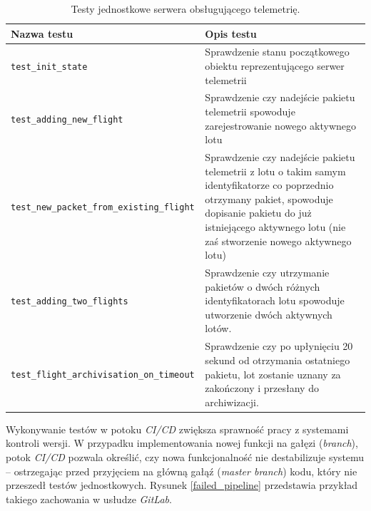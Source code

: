\begin{table}[H]
	\centering\small
	\caption{
        Testy jednostkowe serwera obsługującego telemetrię.
	}
	\label{telem_server_unit_tests}
    
    \begin{tabularx}{\textwidth} { 
        | >{\raggedright\arraybackslash}X 
        | >{\raggedright\arraybackslash}X | }
        \hline
        \textbf{Nazwa testu} & \textbf{Opis testu} \\
        \hline
        \texttt{test\_init\_state} & Sprawdzenie stanu początkowego obiektu reprezentującego serwer telemetrii \\
        \hline
        \texttt{test\_adding\_new\_flight} & Sprawdzenie czy nadejście pakietu telemetrii spowoduje zarejestrowanie nowego aktywnego lotu \\
        \hline
        \texttt{test\_new\_packet\_from\_existing\_flight  } & Sprawdzenie czy nadejście pakietu telemetrii z lotu o takim samym identyfikatorze co poprzednio otrzymany pakiet, spowoduje dopisanie pakietu do już istniejącego aktywnego lotu (nie zaś stworzenie nowego aktywnego lotu) \\
        \hline
        \texttt{test\_adding\_two\_flights} & Sprawdzenie czy utrzymanie pakietów o dwóch różnych identyfikatorach lotu spowoduje utworzenie dwóch aktywnych lotów. \\
        \hline
        \texttt{test\_flight\_archivisation\_on\_timeout} & Sprawdzenie czy po upłynięciu 20 sekund od otrzymania ostatniego pakietu, lot zostanie uznany za zakończony i przesłany do archiwizacji. \\
        \hline
    \end{tabularx}
      
\end{table}



Wykonywanie testów w potoku \textit{CI/CD} zwiększa sprawność
pracy z systemami kontroli wersji. W przypadku implementowania nowej 
funkcji na gałęzi (\textit{branch}), potok \textit{CI/CD} pozwala określić,
czy nowa funkcjonalność nie destabilizuje systemu -- ostrzegając przed 
przyjęciem na główną gałąź (\textit{master branch}) kodu, który nie przeszedł
testów jednostkowych. Rysunek \ref{failed_pipeline} przedstawia przykład
takiego zachowania w usłudze \textit{GitLab}.

